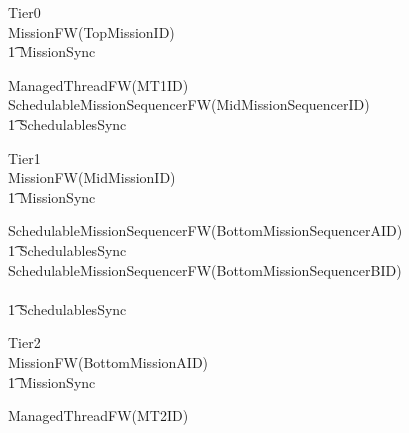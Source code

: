 \begin{circus}
\circprocess Tier0 \circdef \\

\circblockopen
	MissionFW(TopMissionID)\\
		\t1 	\lpar MissionSync \rpar \\
		\circblockopen



			ManagedThreadFW(MT1ID)\\






			SchedulableMissionSequencerFW(MidMissionSequencerID)\\
\t1 \lpar SchedulablesSync \rpar\\



		\circblockclose
\circblockclose
\end{circus}
%
\begin{circus}
\circprocess Tier1 \circdef \\

\circblockopen
	MissionFW(MidMissionID)\\
		\t1 	\lpar MissionSync \rpar \\
		\circblockopen









\circblockopen
			SchedulableMissionSequencerFW(BottomMissionSequencerAID)\\
			\t1 \lpar SchedulablesSync \rpar\\
			SchedulableMissionSequencerFW(BottomMissionSequencerBID)\\
\circblockclose \\
\t1 \lpar SchedulablesSync \rpar\\



		\circblockclose
\circblockclose
\end{circus}
%
\begin{circus}
\circprocess Tier2 \circdef \\

\circblockopen
	MissionFW(BottomMissionAID)\\
		\t1 	\lpar MissionSync \rpar \\
		\circblockopen



			ManagedThreadFW(MT2ID)\\








		\circblockclose
\circblockclose
\end{circus}
